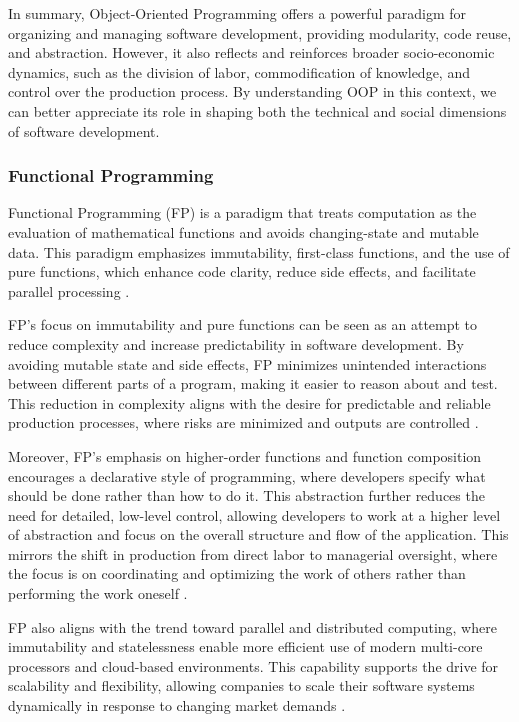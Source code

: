 \begin{refsection}
In summary, Object-Oriented Programming offers a powerful paradigm for organizing and managing software development, providing modularity, code reuse, and abstraction. However, it also reflects and reinforces broader socio-economic dynamics, such as the division of labor, commodification of knowledge, and control over the production process. By understanding OOP in this context, we can better appreciate its role in shaping both the technical and social dimensions of software development.

\subsubsection{Functional Programming}

Functional Programming (FP) is a paradigm that treats computation as the evaluation of mathematical functions and avoids changing-state and mutable data. This paradigm emphasizes immutability, first-class functions, and the use of pure functions, which enhance code clarity, reduce side effects, and facilitate parallel processing \cite[pp.~150-153]{Hughes1990}.

FP's focus on immutability and pure functions can be seen as an attempt to reduce complexity and increase predictability in software development. By avoiding mutable state and side effects, FP minimizes unintended interactions between different parts of a program, making it easier to reason about and test. This reduction in complexity aligns with the desire for predictable and reliable production processes, where risks are minimized and outputs are controlled \cite[pp.~102-105]{Abelson2022}.

Moreover, FP's emphasis on higher-order functions and function composition encourages a declarative style of programming, where developers specify what should be done rather than how to do it. This abstraction further reduces the need for detailed, low-level control, allowing developers to work at a higher level of abstraction and focus on the overall structure and flow of the application. This mirrors the shift in production from direct labor to managerial oversight, where the focus is on coordinating and optimizing the work of others rather than performing the work oneself \cite[pp.~112-115]{Fowler2015}.

FP also aligns with the trend toward parallel and distributed computing, where immutability and statelessness enable more efficient use of modern multi-core processors and cloud-based environments. This capability supports the drive for scalability and flexibility, allowing companies to scale their software systems dynamically in response to changing market demands \cite[pp.~95-97]{Gamma2015}.


\end{refsection}
